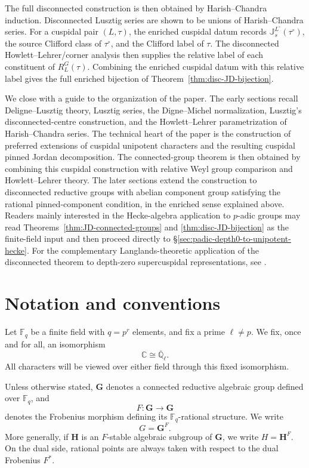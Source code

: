 \documentclass{amsart}
\theoremstyle{plain}
\numberwithin{equation}{section}
\theoremstyle{definition}
\newcommand{\fq}{\mathbb{F}_{q}}
\newcommand{\J}{\mathbb{J}}
\newcommand{\bG}{\mathbf{G}}
\newcommand{\bH}{\mathbf{H}}
\begin{document}
The full disconnected construction is then obtained by Harish--Chandra
induction.  Disconnected Lusztig series are shown to be unions of
Harish--Chandra series.  For a cuspidal pair \((L,\tau)\), the enriched cuspidal
datum records \(\J_s^{L^\circ}(\tau^\circ)\), the source Clifford class of
\(\tau^\circ\), and the Clifford label of \(\tau\).  The disconnected
Howlett--Lehrer/corner analysis then supplies the relative label of each
constituent of \(R_L^G(\tau)\).  Combining the enriched cuspidal datum with this
relative label gives the full enriched bijection of
Theorem~\ref{thm:disc-JD-bijection}.

We close with a guide to the organization of the paper.  The early sections
recall Deligne--Lusztig theory, Lusztig series, the Digne--Michel
normalization, Lusztig's disconnected-centre construction, and the
Howlett--Lehrer parametrization of Harish--Chandra series.  The technical heart
of the paper is the construction of preferred extensions of cuspidal unipotent
characters and the resulting cuspidal pinned Jordan decomposition.  The
connected-group theorem is then obtained by combining this cuspidal
construction with relative Weyl group comparison and Howlett--Lehrer theory.
The later sections extend the construction to disconnected reductive groups
with abelian component group satisfying the rational pinned-component condition,
in the enriched sense explained above.  Readers mainly interested in the
Hecke-algebra application to \(p\)-adic groups may read
Theorems~\ref{thm:JD-connected-groups} and \ref{thm:disc-JD-bijection} as the
finite-field input and then proceed directly to
\S\ref{sec:padic-depth0-to-unipotent-hecke}.  For the complementary
Langlands-theoretic application of the disconnected theorem to depth-zero
supercuspidal representations, see \cite{Mishra2026PinnedLLCDepthZero}.

\section{Notation and conventions}
\label{sec:notation}

Let \(\fq\) be a finite field with \(q=p^r\) elements, and fix a prime
\(\ell\neq p\).  We fix, once and for all, an isomorphism
\[
\mathbb C \cong \overline{\mathbb Q}_{\ell}.
\]
All characters will be viewed over either field through this fixed
isomorphism.

Unless otherwise stated, \(\bG\) denotes a connected reductive algebraic group
defined over \(\fq\), and
\[
F:\bG\longrightarrow \bG
\]
denotes the Frobenius morphism defining its \(\fq\)-rational structure.  We
write
\[
G=\bG^F.
\]
More generally, if \(\bH\) is an \(F\)-stable algebraic subgroup of \(\bG\), we
write \(H=\bH^F\).  On the dual side, rational points are always taken with
respect to the dual Frobenius \(F^*\).
\end{document}
